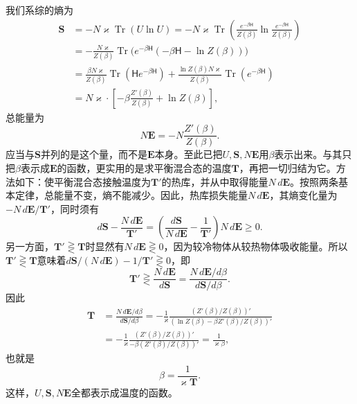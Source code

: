 \documentclass[fontsize=13pt,twoside,openany,headings=normal,parskip=false,bookmarkpackage=false,DIV=calc]{scrbook}
\begin{document}
我们系综的熵为
\begin{align*}
\mathbf S&=-N\varkappa\operatorname{Tr}(U\ln U)
=-N\varkappa\operatorname{Tr}\left(\frac{e^{-\beta \mathsf{H}}}{Z(\beta)}\ln\frac{e^{-\beta \mathsf{H}}}{Z(\beta)}\right)\\
&=-\frac{N\varkappa}{Z(\beta)}\operatorname{Tr}\bigl(e^{-\beta \mathsf{H}}(-\beta \mathsf{H}-\ln Z(\beta))\bigr)\\
&=\frac{\beta N\varkappa}{Z(\beta)}\operatorname{Tr}(\mathsf{H}e^{-\beta \mathsf{H}})
+\frac{\ln Z(\beta)N\varkappa}{Z(\beta)}\operatorname{Tr}(e^{-\beta \mathsf{H}})\\
&=N\varkappa\cdot\left[-\beta\frac{Z'(\beta)}{Z(\beta)}+\ln Z(\beta)\right],
\end{align*}\hypertarget{origpage-210}{}\label{origpage-210}总能量为
\[
N\mathbf E=-N\frac{Z'(\beta)}{Z(\beta)}.
\]
应当与$\mathbf S$并列的是这个量，而不是$\mathbf E$本身。至此已把$U,\allowbreak \mathbf S,\allowbreak N\mathbf E$用$\beta$表示出来。与其只把$\beta$表示成$\mathbf E$的函数，更实用的是求平衡混合态的温度$\mathbf T$，再把一切归结为它。方法如下：使平衡混合态接触温度为$\mathbf T'$的热库，并从中取得能量$N\,d\mathbf E$。按照两条基本定律，总能量不变，熵不能减少。因此，热库损失能量$N\,d\mathbf E$，其熵变化量为$-N\,d\mathbf E/\mathbf T'$，同时须有
\[
d\mathbf S-\frac{N\,d\mathbf E}{\mathbf T'}
=\left(\frac{d\mathbf S}{N\,d\mathbf E}-\frac1{\mathbf T'}\right)N\,d\mathbf E\geq0.
\]
另一方面，$\mathbf T'\gtreqless\mathbf T$时显然有$N\,d\mathbf E\gtreqless0$，因为较冷物体从较热物体吸收能量。所以$\mathbf T'\gtreqless\mathbf T$意味着$d\mathbf S/(N\,d\mathbf E)-1/\mathbf T'\gtreqless0$，即
\[
\mathbf T'\gtreqless\frac{N\,d\mathbf E}{d\mathbf S}
=\frac{N\,d\mathbf E/d\beta}{d\mathbf S/d\beta}.
\]
因此
\begin{align*}
\mathbf T&=\frac{N\,d\mathbf E/d\beta}{d\mathbf S/d\beta}
=-\frac1\varkappa\frac{(Z'(\beta)/Z(\beta))'}{(\ln Z(\beta)-\beta Z'(\beta)/Z(\beta))'}\\
&=-\frac1\varkappa\frac{(Z'(\beta)/Z(\beta))'}{-\beta(Z'(\beta)/Z(\beta))'}
=\frac1{\varkappa\beta},
\end{align*}
也就是
\[
\beta=\frac1{\varkappa\mathbf T}.
\]
这样，$U,\allowbreak \mathbf S,\allowbreak N\mathbf E$全都表示成温度的函数。
\end{document}
